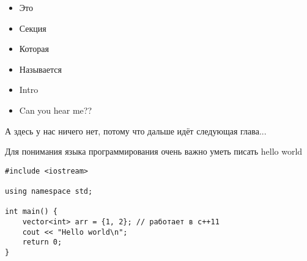 


\enablecode %
\lstset {
  texcl=true %
}


\gdef\CourseName{Example course} %
\author{Example author, and the other author} %

\makegood


  \begin{itemize}
  \item Это
  \item Секция
  \item Которая
  \item Называется
  \item Intro
  \item Can you hear me??
\end{itemize}

  
А здесь у нас ничего нет, потому что дальше идёт следующая глава...

\skipsection[2] %

Для понимания языка программирования очень важно уметь писать hello world
\begin{lstlisting}[style=supercpp]
#include <iostream>

using namespace std;

int main() {
    vector<int> arr = {1, 2}; // работает в c++11
    cout << "Hello world\n";
    return 0;
}
\end{lstlisting}


